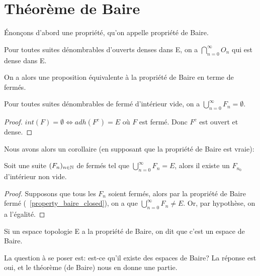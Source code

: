 \chapter{Théorème de Baire}
\label{chapter_baire_theorem}

Énonçons d'abord une propriété, qu'on appelle propriété de Baire.

\begin{propriete} 
\label{property_baire_open}
	Pour toutes suites dénombrables d'ouverts denses dans E, on a $\displaystyle
	\bigcap_{n = 0}^{\infty} O_{n}$ qui est dense dans E.
\end{propriete}

On a alors une proposition équivalente à la propriété de Baire en terme de
fermés.

\begin{propriete} 
\label{property_baire_closed}
	Pour toutes suites dénombrables de fermé d'intérieur vide, on a
	$\displaystyle \bigcup_{n = 0}^{\infty} F_{n} = \emptyset$.
\end{propriete}

\begin{proof}
	$int(F) = \emptyset \Leftrightarrow adh(F^{c}) = E$ où $F$ est fermé. Donc
	$F^{c}$ est ouvert et dense.
\end{proof}

Nous avons alors un corollaire (en supposant que la propriété de Baire est
vraie):

\begin{corollary}
\label{corollary_baire_int_non_empty}
	Soit une suite $(F_{n})_{n \in \mathbb{N}}$ de fermés tel que $\displaystyle
	\bigcup_{n = 0}^{\infty}{F_{n}} = E$, alors il existe un $F_{n_{0}}$
	d'intérieur non vide.
\end{corollary}

\begin{proof}
	Supposons que tous les $F_{n}$ soient fermés, alors par la
	propriété de Baire fermé (~\ref{property_baire_closed}), on a que
	$\displaystyle \bigcup_{n = 0}^{\infty}{F_{n}} \neq E$. Or, par hypothèse,
	on a l'égalité.
\end{proof}

\begin{definition} 
\label{definition_baire_space}
	Si un espace topologie E a la propriété de Baire, on dit que c'est un espace
	de Baire.
\end{definition}

La question à se poser est: est-ce qu'il existe des espaces de Baire? La
réponse est oui, et le théorème (de Baire) nous en donne une partie.

